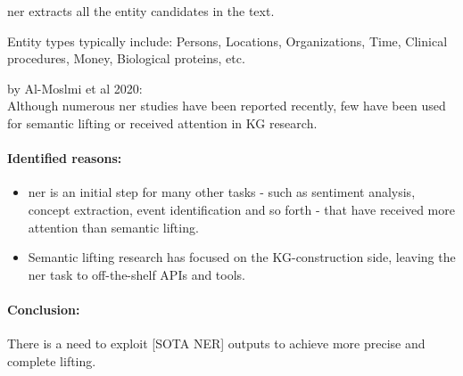 \gls{ner} extracts all the entity candidates in the text.

Entity types typically include: Persons, Locations, Organizations, Time, Clinical
procedures, Money, Biological proteins, etc.

\begin{beo}
    by Al-Moslmi et al 2020: \\
    Although numerous \gls{ner} studies have been reported recently, few have been used for
    semantic lifting or received attention in KG research.

    \paragraph{Identified reasons:}
    \begin{itemize}
        \item \gls{ner} is an initial step for many other tasks - such as sentiment analysis, concept
        extraction, event identification and so forth - that have received more attention
        than semantic lifting.
        \item Semantic lifting research has focused on the KG-construction side, leaving the
        \gls{ner} task to off-the-shelf APIs and tools.
    \end{itemize}
\end{beo}

\paragraph{Conclusion:} There is a need to exploit [SOTA NER] outputs to achieve more precise
and complete lifting.


